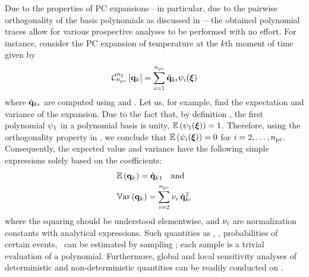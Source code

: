 Due to the properties of PC expansions---in particular, due to the pairwise orthogonality of the basis polynomials as discussed in ---the obtained polynomial traces allow for various prospective analyses to be performed with no effort. For instance, consider the PC expansion of temperature at the $k$th moment of time given by
\begin{equation} \elabel{pc-k}
  \oPC{\nvars}{\pcorder}{\vTO_k} = \sum_{i = 1}^{\pcterms} \pcc{\vTO}_{ki} \pcb_i(\vZ)
\end{equation}
where $\hat{\mathbf{q}}_{ki}$ are computed using  and . Let us, for example, find the expectation and variance of the expansion.
Due to the fact that, by definition \cite{xiu2010}, the first polynomial $\psi_1$ in a polynomial basis is unity, $\mathbb{E}\left(\psi_1(\boldsymbol{\xi})\right) = 1$.
Therefore, using the orthogonality property in , we conclude that $\mathbb{E}\left(\psi_i(\boldsymbol{\xi})\right) = 0$ for $i = 2, \dotsc, {n_\text{pc}}$.
Consequently, the expected value and variance have the following simple expressions solely based on the coefficients:
\begin{equation} \elabel{pc-moments}
\begin{aligned}
  & \oExp{\vTO_k} = \pcc{\vTO}_{k1} \hspace{1em} \text{and} \\
  & \oVar{\vTO_k} = \sum_{i = 2}^{\pcterms} \pcn_i \: \pcc{\vTO}_{ki}^2
\end{aligned}
\end{equation}
where the squaring should be understood elementwise, and $\nu_i$ are normalization constants with analytical expressions. Such quantities as \cdfs, \pdfs, probabilities of certain events, \etc\ can be estimated by sampling ; each sample is a trivial evaluation of a polynomial. Furthermore, global and local sensitivity analyses of deterministic and non-deterministic quantities can be readily conducted on .
